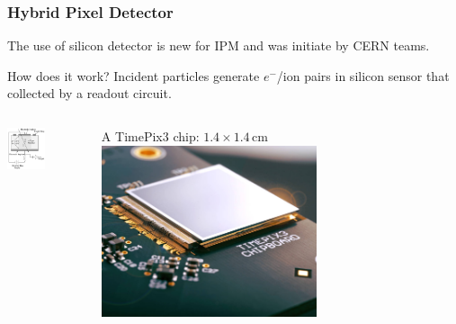 \begin{frame}[t]
  \frametitle{Hybrid Pixel Detector}
  The use of silicon detector is new for IPM and was initiate by CERN teams.
  \begin{block}{How does it work?}
    Incident particles generate $e^{-}$/ion pairs in silicon sensor that collected by a readout circuit.
  \end{block}
  \begin{columns}[T]
    \begin{column}{0.45\textwidth}
      \centering
      \includegraphics[width=0.5\textwidth]{03_SIM/fig/fig000_Si_detector}
    \end{column}
    \begin{column}{0.45\textwidth}
      \centering
      A TimePix3 chip: $1.4\times1.4\,\mathrm{cm}$
      \includegraphics[width=0.6\textwidth]{03_SIM/fig/fig000_TimePix3}
    \end{column}
  \end{columns}


\end{frame}
